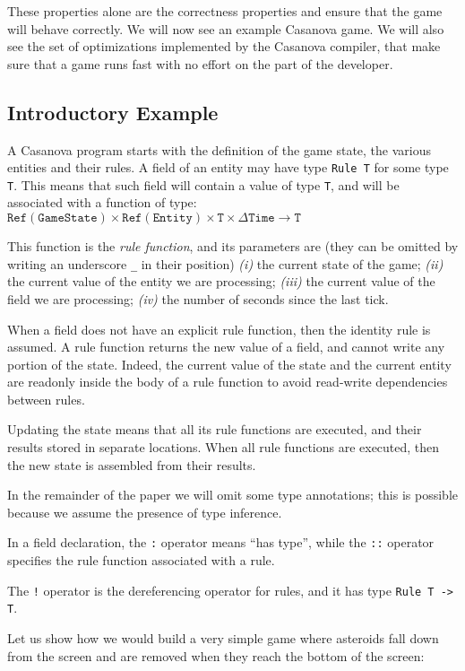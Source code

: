 These properties alone are the correctness properties and ensure that the game will behave correctly. We will now see an example Casanova game. We will also see the set of optimizations implemented by the Casanova compiler, that make sure that a game runs fast with no effort on the part of the developer.


\subsection{Introductory Example}
A Casanova program starts with the definition of the game state, the various entities and their rules. A field of an entity may have type \texttt{Rule T} for some type \texttt{T}. This means that such field will contain a value of type \texttt{T}, and will be associated with a function of type: $ \mathtt{Ref(GameState)} \times \mathtt{Ref(Entity)} \times \mathtt{T}  \times \Delta \mathtt{Time} \rightarrow \mathtt{T} $

This function is the \textit{rule function}, and its parameters are (they can be omitted by writing an underscore \texttt{\_} in their position) \textit{(i)} the current state of the game; \textit{(ii)} the current value of the entity we are processing; \textit{(iii)} the current value of the field we are processing; \textit{(iv)} the number of seconds since the last tick.

When a field does not have an explicit rule function, then the identity rule is assumed. A rule function returns the new value of a field, and cannot write any portion of the state. Indeed, the current value of the state and the current entity are readonly inside the body of a rule function to avoid read-write dependencies between rules.

Updating the state means that all its rule functions are executed, and their results stored in separate locations. When all rule functions are executed, then the new state is assembled from their results.

In the remainder of the paper we will omit some type annotations; this is possible because we assume the presence of type inference.

In a field declaration, the \texttt{:} operator means ``has type'', while the \texttt{::} operator specifies the rule function associated with a rule.

The \texttt{!} operator is the dereferencing operator for rules, and it has type \texttt{Rule T -> T}.

Let us show how we would build a very simple game where asteroids fall down from the screen and are removed when they reach the bottom of the screen:

